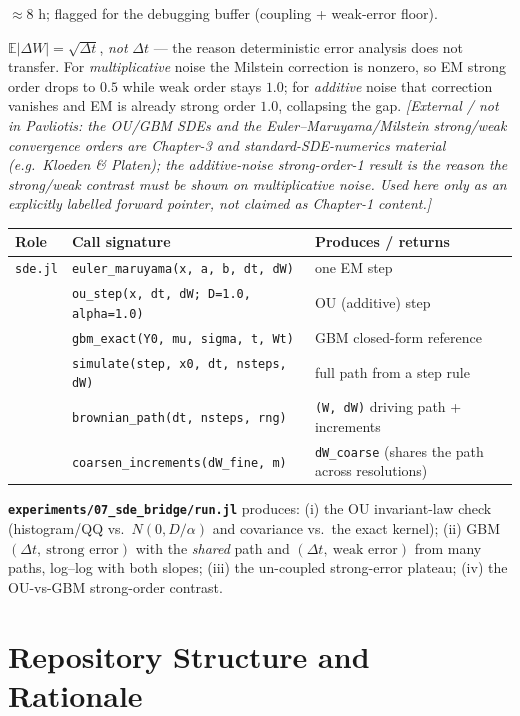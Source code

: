 \documentclass[11pt]{article}
\makeatletter
\newcommand{\extnote}[1]{{\small\color{extgray}\emph{[External / not in Pavliotis: #1]}}}
\newenvironment{unitmeta}{%
  \begin{description}[style=sameline,leftmargin=1.4cm,font=\bfseries\color{hubblue}]
}{%
  \end{description}
}
\newenvironment{contracttable}{%
  \par\smallskip\noindent{\bfseries\color{hubblue}Implementation contract.}\par\nopagebreak\smallskip
  \small
  \setlength{\extrarowheight}{2pt}%
  \noindent\begin{tabular}{@{}p{3.5cm}p{6.8cm}p{4.2cm}@{}}
  \toprule
  \textbf{Role} & \textbf{Call signature} & \textbf{Produces / returns} \\
  \midrule
}{%
  \bottomrule
  \end{tabular}\par\smallskip
}
\makeatother
\begin{document}
\begin{unitmeta}
\item[Effort] $\approx 8$ h; flagged for the debugging buffer (coupling + weak-error floor).
\item[Prerequisite] $\mathbb{E}|\Delta W| = \sqrt{\Delta t}$, \emph{not} $\Delta t$ --- the reason deterministic error analysis does not transfer. For \emph{multiplicative} noise the Milstein correction is nonzero, so EM strong order drops to $0.5$ while weak order stays $1.0$; for \emph{additive} noise that correction vanishes and EM is already strong order $1.0$, collapsing the gap. \extnote{the OU/GBM SDEs and the Euler--Maruyama/Milstein strong/weak convergence orders are Chapter-3 and standard-SDE-numerics material (e.g.\ Kloeden \& Platen); the additive-noise strong-order-1 result is the reason the strong/weak contrast must be shown on multiplicative noise. Used here only as an explicitly labelled forward pointer, not claimed as Chapter-1 content.}
\end{unitmeta}

\begin{contracttable}
\texttt{sde.jl} & \texttt{euler\_maruyama(x, a, b, dt, dW)} & one EM step \\
 & \texttt{ou\_step(x, dt, dW; D=1.0, alpha=1.0)} & OU (additive) step \\
 & \texttt{gbm\_exact(Y0, mu, sigma, t, Wt)} & GBM closed-form reference \\
 & \texttt{simulate(step, x0, dt, nsteps, dW)} & full path from a step rule \\
 & \texttt{brownian\_path(dt, nsteps, rng)} & \texttt{(W, dW)} driving path + increments \\
 & \texttt{coarsen\_increments(dW\_fine, m)} & \texttt{dW\_coarse} (shares the path across resolutions) \\
\end{contracttable}
\noindent\textbf{\texttt{experiments/07\_sde\_bridge/run.jl}} produces: (i) the OU invariant-law check (histogram/QQ vs.\ $N(0,D/\alpha)$ and covariance vs.\ the exact kernel); (ii) GBM $(\Delta t,\ \text{strong error})$ with the \emph{shared} path and $(\Delta t,\ \text{weak error})$ from many paths, log--log with both slopes; (iii) the un-coupled strong-error plateau; (iv) the OU-vs-GBM strong-order contrast.

\section{Repository Structure and Rationale}
\end{document}
